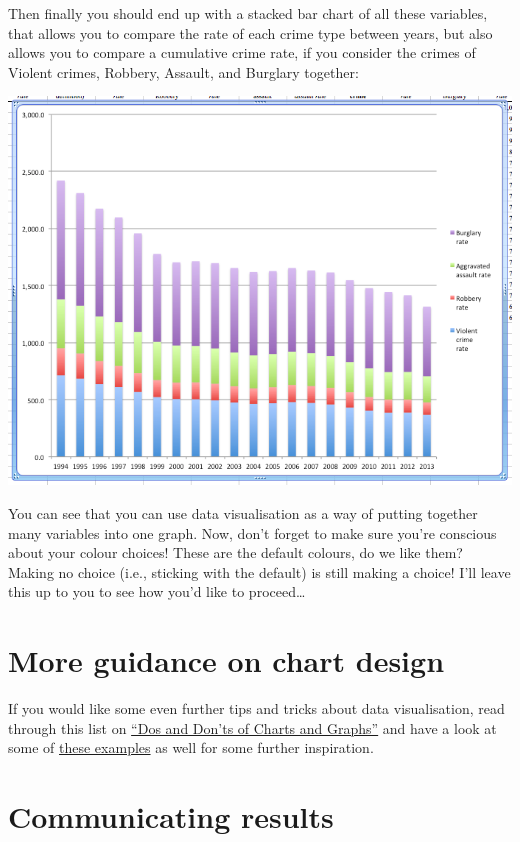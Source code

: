 \documentclass[
]{book}
\begin{document}
Then finally you should end up with a stacked bar chart of all these variables, that allows you to compare the rate of each crime type between years, but also allows you to compare a cumulative crime rate, if you consider the crimes of Violent crimes, Robbery, Assault, and Burglary together:

\includegraphics{imgs/stackedbar_final.png}

You can see that you can use data visualisation as a way of putting together many variables into one graph. Now, don't forget to make sure you're conscious about your colour choices! These are the default colours, do we like them? Making no choice (i.e., sticking with the default) is still making a choice! I'll leave this up to you to see how you'd like to proceed\ldots{}

\hypertarget{more-guidance-on-chart-design}{%
\section{More guidance on chart design}\label{more-guidance-on-chart-design}}

If you would like some even further tips and tricks about data visualisation, read through this list on \href{https://guides.library.duke.edu/datavis/topten}{``Dos and Don'ts of Charts and Graphs''} and have a look at some of \href{http://datajournalismhandbook.org/1.0/en/introduction_3.html}{these examples} as well for some further inspiration.

\hypertarget{communicating-results}{%
\section{Communicating results}\label{communicating-results}}
\end{document}
